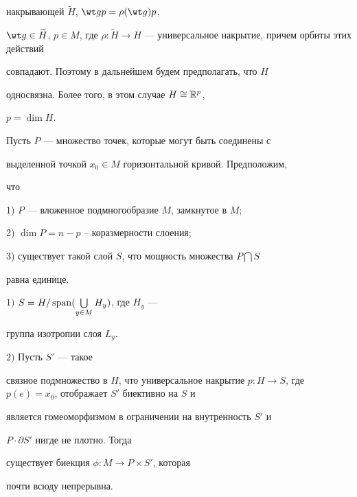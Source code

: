 накрывающей $\widetilde H$, $\wt g p = \rho(\wt g) p$,


$\wt g \in \widetilde H$, $p \in M$, где $\rho : \widetilde H


\to H$ --- универсальное накрытие, причем орбиты этих действий


совпадают. Поэтому в дальнейшем будем предполагать, что $H$


односвязна. Более того, в этом случае $H\cong {\Bbb R}^p$,


$p=\dim H$.





Пусть $P$ --- множество точек, которые могут быть соединены с


выделенной точкой $x_0 \in M$ горизонтальной кривой. Предположим,


что





1) $P$ --- вложенное подмногообразие $M$, замкнутое в $M$;





2) $\dim P=n-p$ -- коразмерности слоения;





3) существует такой слой $S$, что мощность множества $P \bigcap S$


равна единице.





\begin{thm} \label{st1}


$1)$ $S=H/\operatorname{span}(\bigcup \limits_{y \in M} H_y)$, где $H_y$ ---


группа изотропии слоя $L_y$.





$2)$ Пусть $S'$ --- такое


связное подмножество в $H$, что универсальное накрытие $p :


H \to S$, где $p(e) = x_0$, отображает $S'$ биективно на $S$ и


является гомеоморфизмом в ограничении на внутренность $S'$ и


$P \cdot \partial S'$ нигде не плотно. Тогда


существует биекция $\phi: M \rightarrow P \times S'$, которая


почти всюду непрерывна.


\end{thm}





